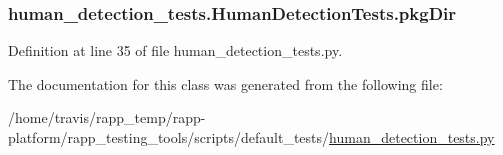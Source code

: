 \hypertarget{classhuman__detection__tests_1_1HumanDetectionTests_ad116e235c6cef7746735fe37ef61713d}{
\subsubsection[{pkg\-Dir}]{\setlength{\rightskip}{0pt plus 5cm}human\-\_\-detection\-\_\-tests.\-Human\-Detection\-Tests.\-pkg\-Dir}}\label{classhuman__detection__tests_1_1HumanDetectionTests_ad116e235c6cef7746735fe37ef61713d}


Definition at line 35 of file human\-\_\-detection\-\_\-tests.\-py.



The documentation for this class was generated from the following file\-:\begin{DoxyCompactItemize}
\item 
/home/travis/rapp\-\_\-temp/rapp-\/platform/rapp\-\_\-testing\-\_\-tools/scripts/default\-\_\-tests/\hyperlink{human__detection__tests_8py}{human\-\_\-detection\-\_\-tests.\-py}\end{DoxyCompactItemize}
